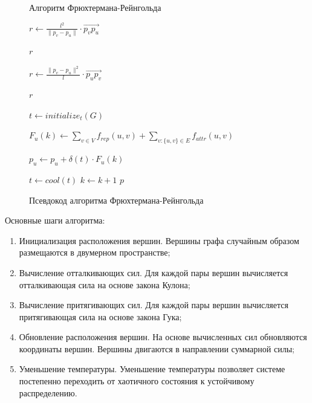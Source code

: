 \documentclass[14pt, russian]{scrartcl}
\begin{document}
\begin{figure}[H]
	\centering
	\begin{minipage}[t]{.9\textwidth}
		\centering

		\begin{algorithm}[H]
			\caption{Алгоритм Фрюхтермана-Рейнгольда}
			\begin{algorithmic}

				\State $r \gets \frac{l^2}{\|p_v - p_u \|}  \cdot \overrightarrow{p_v p_u}  $

				\Return $r$
				\EndFunction


				\State $r \gets \frac{\|p_v - p_u \|^2}{l} \cdot \overrightarrow{p_u p_v}  $

				\Return $r$
				\EndFunction


        \State $t \gets initialize_t(G)$

				\State $F_{u}(k) \gets \sum_{v \in V}{f_{rep}(u, v)} + \sum_{v:\{u,v\} \in E}{f_{attr}(u, v)}$


				\EndFor
				\State $p_u \gets p_u + \delta(t) \cdot F_u(k)$
				\EndFor

				\State $t \gets cool(t)$
				\State $k \gets k + 1$
				\EndWhile
				\Return $p$
				\EndFunction

			\end{algorithmic}
		\end{algorithm}
	\end{minipage}
	\caption{Псевдокод алгоритма Фрюхтермана-Рейнгольда}
	\label{fig:fr_alg}
\end{figure}


Основные шаги алгоритма:

\begin{enumerate}
	\item{Инициализация расположения вершин. Вершины графа случайным образом размещаются в двумерном пространстве;}
	\item{Вычисление отталкивающих сил. Для каждой пары вершин вычисляется отталкивающая сила на основе закона Кулона;}
	\item{Вычисление притягивающих сил. Для каждой пары вершин вычисляется притягивающая сила на основе закона Гука;}
	\item{Обновление расположения вершин. На основе вычисленных сил обновляются координаты вершин. Вершины двигаются в направлении суммарной силы;}
	\item{Уменьшение температуры. Уменьшение температуры позволяет системе постепенно переходить от хаотичного состояния к устойчивому распределению.
	      }

\end{enumerate}
\end{document}
